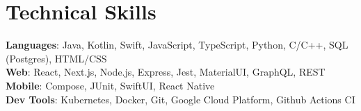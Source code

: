 \documentclass[letterpaper,11pt]{article}
\begin{document}
\section{Technical Skills}
 \begin{itemize}[leftmargin=0.15in, label={}]
    \small{\item{
     \textbf{Languages}{: Java, Kotlin, Swift, JavaScript, TypeScript, Python, C/C++, SQL (Postgres), HTML/CSS} \\
     \textbf{Web}{: React, Next.js, Node.js, Express, Jest, MaterialUI, GraphQL, REST} \\
     \textbf{Mobile}{: Compose, JUnit, SwiftUI, React Native} \\
     \textbf{Dev Tools}{: Kubernetes, Docker, Git, Google Cloud Platform, Github Actions CI}
    }}
 \end{itemize}


\end{document}
